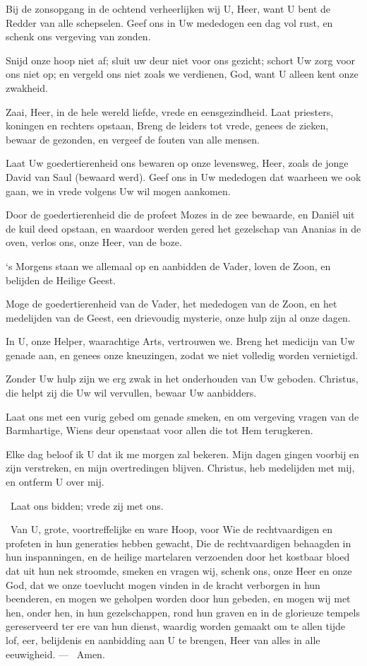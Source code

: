 \documentclass[12pt,twoside,a5paper]{article}
\begin{document}
\begin{halfparskip}
   Bij de zonsopgang in de ochtend verheerlijken wij U, Heer, want U bent de Redder van alle schepselen. Geef ons in Uw mededogen een dag vol rust, en schenk ons vergeving van zonden.

  Snijd onze hoop niet af; sluit uw deur niet voor ons gezicht; schort Uw zorg voor ons niet op; en vergeld ons niet zoals we verdienen, God, want U alleen kent onze zwakheid.

  Zaai, Heer, in de hele wereld liefde, vrede en eensgezindheid. Laat priesters, koningen en rechters opstaan, Breng de leiders tot vrede, genees de zieken, bewaar de gezonden, en vergeef de fouten van alle mensen.

  Laat Uw goedertierenheid ons bewaren op onze levensweg, Heer, zoals de jonge David van Saul (bewaard werd). Geef ons in Uw mededogen dat waarheen we ook gaan, we in vrede volgens Uw wil mogen aankomen.

  Door de goedertierenheid die de profeet Mozes in de zee bewaarde, en Daniël uit de kuil deed opstaan, en waardoor werden gered het gezelschap van Ananias in de oven, verlos ons, onze Heer, van de boze.

   `s Morgens staan we allemaal op en aanbidden de Vader, loven de Zoon, en belijden de Heilige Geest.

  Moge de goedertierenheid van de Vader, het mededogen van de Zoon, en het medelijden van de Geest, een drievoudig mysterie, onze hulp zijn al onze dagen.

  In U, onze Helper, waarachtige Arts, vertrouwen we. Breng het medicijn van Uw genade aan, en genees onze kneuzingen, zodat we niet volledig worden vernietigd.

  Zonder Uw hulp zijn we erg zwak in het onderhouden van Uw geboden. Christus, die helpt zij die Uw wil vervullen, bewaar Uw aanbidders.

  Laat ons met een vurig gebed om genade smeken, en om vergeving vragen van de Barmhartige, Wiens deur openstaat voor allen die tot Hem terugkeren.

  Elke dag beloof ik U dat ik me morgen zal bekeren. Mijn dagen gingen voorbij en zijn verstreken, en mijn overtredingen blijven. Christus, heb medelijden met mij, en ontferm U over mij.
\end{halfparskip}

\rr\ Laat ons bidden; vrede zij met ons.

\cc\ Van U, grote, voortreffelijke en ware Hoop, voor Wie de rechtvaardigen en profeten in hun generaties hebben gewacht, Die de rechtvaardigen behaagden in hun inspanningen, en de heilige martelaren verzoenden door het kostbaar bloed dat uit hun nek stroomde, smeken en vragen wij, schenk ons, onze Heer en onze God, dat we onze toevlucht mogen vinden in de kracht verborgen in hun beenderen, en mogen we geholpen worden door hun gebeden, en mogen wij met hen, onder hen, in hun gezelschappen, rond hun graven en in de glorieuze tempels gereserveerd ter ere van hun dienst, waardig worden gemaakt om te allen tijde lof, eer, belijdenis en aanbidding aan U te brengen, Heer van alles in alle eeuwigheid. --- \rr\ Amen.
\end{document}

